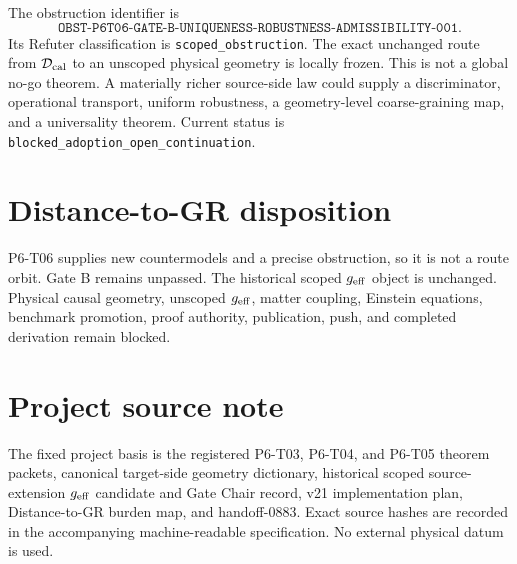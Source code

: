 \documentclass[11pt]{article}
\begin{document}
The obstruction identifier is
\[
\texttt{OBST-P6T06-GATE-B-UNIQUENESS-ROBUSTNESS-ADMISSIBILITY-001}.
\]
Its Refuter classification is \texttt{scoped\_obstruction}. The exact
unchanged route from \(\mathcal D_{\rm cal}\) to an unscoped physical geometry
is locally frozen. This is not a global no-go theorem. A materially richer
source-side law could supply a discriminator, operational transport, uniform
robustness, a geometry-level coarse-graining map, and a universality theorem.
Current status is
\texttt{blocked\_adoption\_open\_continuation}.

\section{Distance-to-GR disposition}

P6-T06 supplies new countermodels and a precise obstruction, so it is not a
route orbit. Gate B remains unpassed. The historical scoped \(g_{\rm eff}\)
object is unchanged. Physical causal geometry, unscoped \(g_{\rm eff}\),
matter coupling, Einstein equations, benchmark promotion, proof authority,
publication, push, and completed derivation remain blocked.

\section{Project source note}

The fixed project basis is the registered P6-T03, P6-T04, and P6-T05 theorem
packets, canonical target-side geometry dictionary, historical scoped
source-extension \(g_{\rm eff}\) candidate and Gate Chair record, v21
implementation plan, Distance-to-GR burden map, and handoff-0883. Exact
source hashes are recorded in the accompanying machine-readable
specification. No external physical datum is used.
\end{document}
